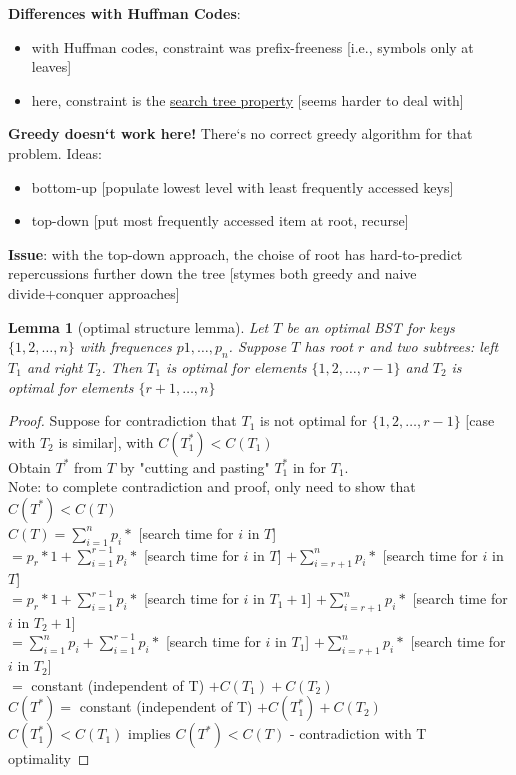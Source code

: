 \documentclass[a4paper,12pt]{article}
\theoremstyle{plain}
\newtheorem*{lemma}{Lemma}
\theoremstyle{definition}
\theoremstyle{remark}
\begin{document}
\textbf{Differences with Huffman Codes}:
\begin{itemize}
	\item with Huffman codes, constraint was prefix-freeness [i.e., symbols only at leaves]
	\item here, constraint is the \underline{search tree property} [seems harder to deal with]
\end{itemize}

\textbf{Greedy doesn`t work here!} There`s no correct greedy algorithm for that problem. Ideas:
\begin{itemize}
	\item bottom-up [populate lowest level with least frequently accessed keys]
	\item top-down [put most frequently accessed item at root, recurse]
\end{itemize}

\textbf{Issue}: with the top-down approach, the choise of root has hard-to-predict repercussions further down the tree [stymes both greedy and naive divide+conquer approaches]

\begin{lemma} [optimal structure lemma] Let $T$ be an optimal BST for keys $\{1, 2, \dots, n\}$ with frequences $p1, \dots, p_n$. Suppose $T$ has root $r$ and two subtrees: left $T_1$ and right $T_2$. Then $T_1$ is optimal for elements $\{1, 2, \dots, r-1\}$ and $T_2$ is optimal for elements $\{r+1, \dots, n\}$\end{lemma}

\begin{proof}Suppose for contradiction that $T_1$ is not optimal for $\{1, 2, \dots, r-1\}$ [case with $T_2$ is similar], with $C(T_1^*) < C(T_1)$\\

Obtain $T^*$ from $T$ by "cutting and pasting" $T_1^*$ in for $T_1$.
\\

Note: to complete contradiction and proof, only need to show that $C(T^*) < C(T)$
\\

$C(T) = \sum\limits_{i=1}^{n} p_i *$ [search time for $i$ in $T$]\\
$= p_r * 1 + \sum\limits_{i=1}^{r-1} p_i *$ [search time for $i$ in $T$] $+ \sum\limits_{i=r+1}^{n} p_i *$ [search time for $i$ in $T$]\\
$= p_r * 1 + \sum\limits_{i=1}^{r-1} p_i *$ [search time for $i$ in $T_1 + 1$] $+ \sum\limits_{i=r+1}^{n} p_i *$ [search time for $i$ in $T_2 + 1$]\\
$= \sum\limits_{i=1}^{n} p_i + \sum\limits_{i=1}^{r-1} p_i *$ [search time for $i$ in $T_1$] $+ \sum\limits_{i=r+1}^{n} p_i *$ [search time for $i$ in $T_2$]\\
$=$ constant (independent of T) $+ C(T_1) + C(T_2)$\\

$C(T^*) =$ constant (independent of T) $+ C(T_1^*) + C(T_2)$\\

$C(T_1^*) < C(T_1)$ implies $C(T^*) < C(T)$ - contradiction with T optimality
\end{proof}
\end{document}
